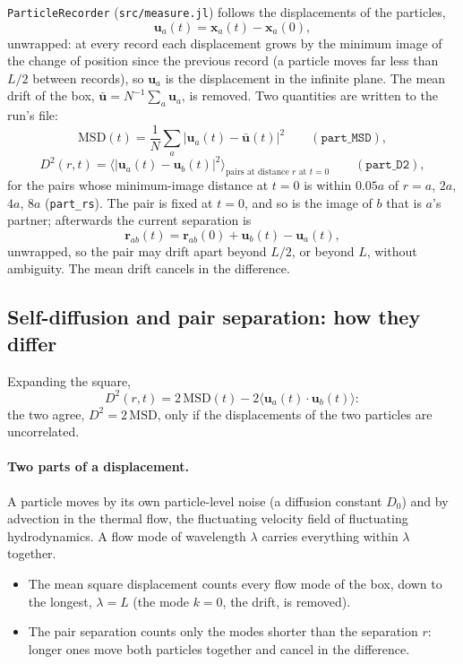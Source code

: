 \documentclass[11pt,aps,preprint,nofootinbib,superscriptaddress,tightenlines]{revtex4-2}
\def\st{\begin{equation}}
\def\stp{\end{equation}}
\newcommand{\avg}[1]{\langle #1\rangle}
\let\oldparagraph\paragraph
\renewcommand{\paragraph}{\par\bigskip\oldparagraph}
\begin{document}
\texttt{ParticleRecorder} (\texttt{src/measure.jl}) follows the displacements of the particles,
\st
\bm u_a(t)=\bm x_a(t)-\bm x_a(0),
\stp
unwrapped: at every record each displacement grows by the minimum image of the change of position since the previous record
(a particle moves far less than $L/2$ between records), so $\bm u_a$ is the displacement in the infinite plane.  The mean drift of the
box, $\bar{\bm u}=N^{-1}\sum_a\bm u_a$, is removed.  Two quantities are written to the run's file:
\st
\mathrm{MSD}(t)=\frac1N\sum_a\big|\bm u_a(t)-\bar{\bm u}(t)\big|^2\qquad(\texttt{part\_MSD}),
\stp
\st
D^2(r,t)=\Big\langle\big|\bm u_a(t)-\bm u_b(t)\big|^2\Big\rangle_{\text{pairs at distance }r\text{ at }t=0}\qquad(\texttt{part\_D2}),
\stp
for the pairs whose minimum-image distance at $t=0$ is within $0.05a$ of $r=a$, $2a$, $4a$, $8a$ (\texttt{part\_rs}).  The pair is fixed at
$t=0$, and so is the image of $b$ that is $a$'s partner; afterwards the current separation is
\st
\bm r_{ab}(t)=\bm r_{ab}(0)+\bm u_b(t)-\bm u_a(t),
\stp
unwrapped, so the pair may drift apart beyond $L/2$, or beyond $L$, without ambiguity.  The mean drift cancels in the difference.

\subsection{Self-diffusion and pair separation: how they differ}
\label{sec:differ}

Expanding the square,
\st
D^2(r,t)=2\,\mathrm{MSD}(t)-2\avg{\bm u_a(t)\cdot\bm u_b(t)} :
\label{D2MSD}
\stp
the two agree, $D^2=2\,\mathrm{MSD}$, only if the displacements of the two particles are uncorrelated.

\paragraph{Two parts of a displacement.}  A particle moves by its own particle-level noise (a diffusion constant $D_0$) and by
advection in the thermal flow, the fluctuating velocity field of fluctuating hydrodynamics.  A flow mode of wavelength $\lambda$ carries
everything within $\lambda$ together.
\begin{itemize}
\item The mean square displacement counts every flow mode of the box, down to the longest, $\lambda=L$ (the mode $k=0$, the drift, is
  removed).
\item The pair separation counts only the modes shorter than the separation $r$: longer ones move both particles together and
  cancel in the difference.
\end{itemize}
\end{document}
